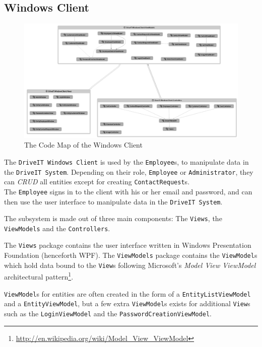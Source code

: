 \subsection{Windows Client} 
\begin{figure}[H]
	\centering
	\includegraphics[width=\textwidth]{Figures/WindowsClientCodeMap}
	\caption{The Code Map of the Windows Client}
	\label{fig:WindowsClientCodeMap}
\end{figure}
The \texttt{DriveIT Windows Client} is used by the \texttt{Employee}s, to manipulate data in the \texttt{DriveIT System}. Depending on their role, \texttt{Employee} or \texttt{Administrator}, they can \textit{CRUD} all entities except for creating \texttt{ContactRequest}s.\\

The \texttt{Employee} signs in to the client with his or her email and password, and can then use the user interface to manipulate data in the \texttt{DriveIT System}.

The subsystem is made out of three main components: The \texttt{Views}, the \texttt{ViewModels} and the \texttt{Controllers}.

The \texttt{Views} package contains the user interface written in Windows Presentation Foundation (henceforth WPF). The \texttt{ViewModels} package contains the \texttt{ViewModel}s which hold data bound to the \texttt{View}s following Microsoft's \textit{Model View ViewModel} architectural pattern\footnote{\url{http://en.wikipedia.org/wiki/Model_View_ViewModel}}.

\texttt{ViewModel}s for entities are often created in the form of a \texttt{EntityListViewModel} and a \texttt{EntityViewModel}, but a few extra \texttt{ViewModel}s exists for additional \texttt{View}s such as the \texttt{LoginViewModel} and the \texttt{PasswordCreationViewModel}.

